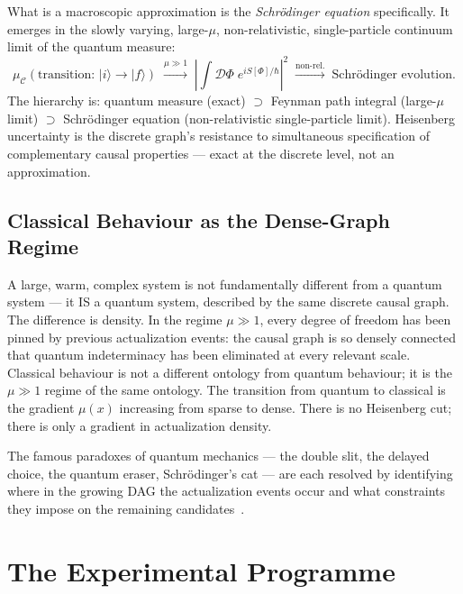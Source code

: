 \documentclass[11pt,a4paper]{article}
\begin{document}
What is a macroscopic approximation is the \emph{Schr\"odinger equation}
specifically. It emerges in the slowly varying, large-$\mu$,
non-relativistic, single-particle continuum limit of the quantum measure:
\begin{equation}
  \mu_{\mathcal{C}}(\text{transition: } |i\rangle \to |f\rangle)
  \;\xrightarrow{\mu \gg 1}\;
  \left|\int \mathcal{D}\Phi\; e^{iS[\Phi]/\hbar}\right|^2
  \;\xrightarrow{\text{non-rel.}}\;
  \text{Schr\"odinger evolution.}
  \label{eq:schrodinger_limit}
\end{equation}
The hierarchy is: quantum measure (exact) $\supset$ Feynman path integral
(large-$\mu$ limit) $\supset$ Schr\"odinger equation (non-relativistic
single-particle limit). Heisenberg uncertainty is the discrete graph's
resistance to simultaneous specification of complementary causal properties
--- exact at the discrete level, not an approximation.

\subsection{Classical Behaviour as the Dense-Graph Regime}

A large, warm, complex system is not fundamentally different from a
quantum system --- it IS a quantum system, described by the same
discrete causal graph. The difference is density. In the regime
$\mu \gg 1$, every degree of freedom has been pinned by previous
actualization events: the causal graph is so densely connected that
quantum indeterminacy has been eliminated at every relevant scale.
Classical behaviour is not a different ontology from quantum behaviour;
it is the $\mu \gg 1$ regime of the same ontology. The transition
from quantum to classical is the gradient $\mu(x)$ increasing from
sparse to dense. There is no Heisenberg cut; there is only a
gradient in actualization density.

The famous paradoxes of quantum mechanics --- the double slit, the
delayed choice, the quantum eraser, Schr\"{o}dinger's cat --- are each
resolved by identifying where in the growing DAG the actualization
events occur and what constraints they impose on the remaining
candidates~\citep{Sandeman2026RAQM}.

\section{The Experimental Programme}
\label{sec:experiment}
\end{document}
